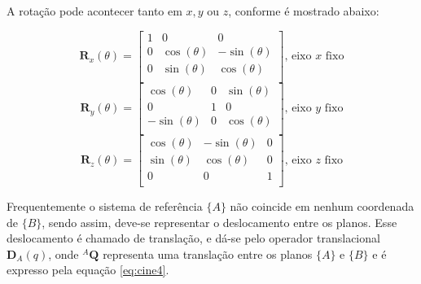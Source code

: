     

    A rotação pode acontecer tanto em $x, y$ ou $z$, conforme é mostrado abaixo:

    \begin{equation*}
        \mathbf{R}_x(\theta) =
        \begin{bmatrix}
            1 & 0            & 0             \\
            0 & \cos(\theta) & -\sin(\theta) \\
            0 & \sin(\theta) & \cos(\theta)  \\
        \end{bmatrix} \text{, eixo $x$ fixo}
    \end{equation*}
    \begin{equation*}
        \mathbf{R}_y(\theta) =
        \begin{bmatrix}
            \cos(\theta)  & 0 & \sin(\theta) \\
            0             & 1 & 0            \\
            -\sin(\theta) & 0 & \cos(\theta) \\
        \end{bmatrix} \text{, eixo $y$ fixo}
    \end{equation*}
    \begin{equation*}
        \mathbf{R}_z(\theta) =
        \begin{bmatrix}
            \cos(\theta) & -\sin(\theta) & 0 \\
            \sin(\theta) & \cos(\theta) & 0 \\
            0            & 0            & 1 \\
        \end{bmatrix} \text{, eixo $z$ fixo}
    \end{equation*}

    Frequentemente o sistema de referência $\{A\}$ não coincide em nenhum coordenada de $\{B\}$, sendo assim, deve-se representar o deslocamento entre os planos. Esse deslocamento é chamado de translação, e dá-se pelo operador translacional $\mathbf{D}_A(q)$, onde ${}^A\mathbf{Q}$ representa uma translação entre os planos $\{A\}$ e $\{B\}$ e é expresso pela equação \eqref{eq:cine4}.

